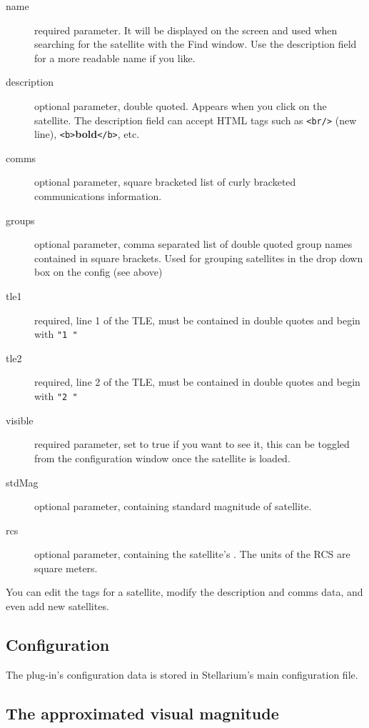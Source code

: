 \begin{description}
\item[name]  required parameter. It will be displayed on the screen and used
when searching for the satellite with the Find window. Use the
description field for a more readable name if you like.
\item[description]  optional parameter, double quoted. Appears when you click on the satellite.
  The description field can accept HTML tags such as \texttt{<br/>} (new line), \texttt{<b>}\textbf{bold}\texttt{</b>}, etc.
\item[comms]  optional parameter, square bracketed list of curly bracketed communications information.
\item[groups]  optional parameter, comma separated list of double quoted group names contained in square brackets.
  Used for grouping satellites in the drop down box on the config (see above)
\item[tle1]  required, line 1 of the TLE, must be contained in double quotes and begin with \texttt{"1~"}
\item[tle2]  required, line 2 of the TLE, must be contained in double quotes and begin with \texttt{"2~"}
\item[visible]  required parameter, set to true if you want to see it, this can be toggled from the configuration window once the satellite is loaded. 
\item[stdMag]  optional parameter, containing standard magnitude of satellite. 
\item[rcs] optional parameter, containing the satellite's  . The units of the RCS are square meters.
\end{description}
You can edit the tags for a satellite, modify the description and comms data, and even add new satellites. 

\subsection{Configuration}

The plug-in's configuration data is stored in Stellarium's main configuration file.

\subsection{The approximated visual magnitude}
\label{sec:plugins:Satellites:VisualMagnitude}

